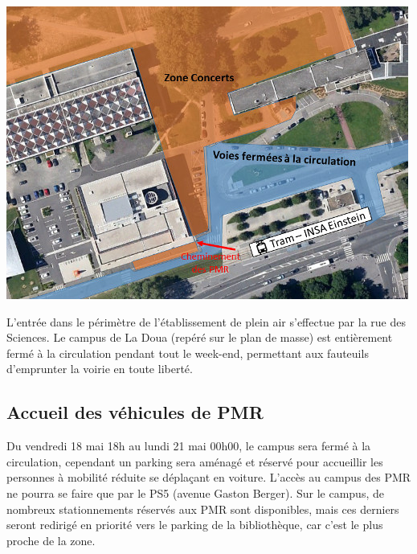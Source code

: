 \documentclass[hidelinks, paper=a4, fontsize=13pt]{report}
\begin{document}
\begin{center}
\includegraphics[width=\textwidth,keepaspectratio]{Annexes/Images/PMR_entree}
\end{center}
L’entrée dans le périmètre de l’établissement de plein air s’effectue par la rue des Sciences. Le campus de La Doua (repéré sur le plan de masse) est entièrement fermé à la circulation pendant tout le week-end, permettant aux fauteuils d’emprunter la voirie en toute liberté.

\subsection{Accueil des véhicules de PMR}

Du vendredi 18 mai 18h au lundi 21 mai 00h00, le campus sera fermé à la circulation, cependant un parking sera aménagé et réservé pour accueillir les personnes à mobilité réduite se déplaçant en voiture. L’accès au campus des PMR ne pourra se faire que par le PS5 (avenue Gaston Berger). Sur le campus, de nombreux stationnements réservés aux PMR sont disponibles, mais ces derniers seront redirigé en priorité vers le parking de la bibliothèque, car c'est le plus proche de la zone.
\end{document}
